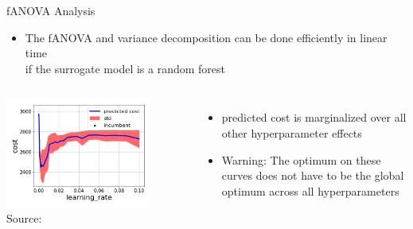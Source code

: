 \begin{frame}[c,fragile]{fANOVA Analysis}

\begin{itemize}
	\item The fANOVA and variance decomposition can be done efficiently in linear time\\
	 if the surrogate model is a random forest~
	\pause
\end{itemize}

\begin{columns}
	
	\begin{center}
	\includegraphics[width=0.8\textwidth]{images/learning_rate_fanova.png}\\
	Source: 
	\end{center}
	
	
	\begin{itemize}
		\item predicted cost is marginalized over all other hyperparameter effects
		\item \alert{Warning}: The optimum on these curves does not have to be the global optimum across all hyperparameters
	\end{itemize}
\end{columns}



\end{frame}


